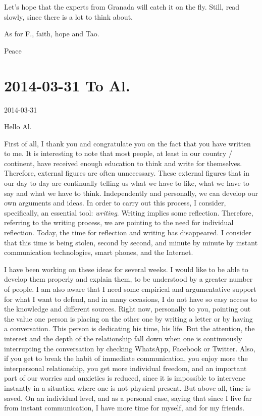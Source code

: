 \documentclass[]{book}
\begin{document}
Let's hope that the experts from Granada will catch it on the fly. Still, read slowly, since there is a lot to think about.

As for F., faith, hope and Tao.

Peace

\hypertarget{ToAl20140331}{%
\section*{2014-03-31 To Al.}\label{ToAl20140331}}

2014-03-31

Hello Al.

First of all, I thank you and congratulate you on the fact that you have written to me. It is interesting to note that most people, at least in our country / continent, have received enough education to think and write for themselves. Therefore, external figures are often unnecessary. These external figures that in our day to day are continually telling us what we have to like, what we have to say and what we have to think. Independently and personally, we can develop our own arguments and ideas. In order to carry out this process, I consider, specifically, an essential tool: \emph{writing}. Writing implies some reflection. Therefore, referring to the writing process, we are pointing to the need for individual reflection. Today, the time for reflection and writing has disappeared. I consider that this time is being stolen, second by second, and minute by minute by instant communication technologies, smart phones, and the Internet.

I have been working on these ideas for several weeks. I would like to be able to develop them properly and explain them, to be understood by a greater number of people. I am also aware that I need some empirical and argumentative support for what I want to defend, and in many occasions, I do not have so easy access to the knowledge and different sources. Right now, personally to you, pointing out the value one person is placing on the other one by writing a letter or by having a conversation. This person is dedicating his time, his life. But the attention, the interest and the depth of the relationship fall down when one is continuously interrupting the conversation by checking WhatsApp, Facebook or Twitter. Also, if you get to break the habit of immediate communication, you enjoy more the interpersonal relationship, you get more individual freedom, and an important part of our worries and anxieties is reduced, since it is impossible to intervene instantly in a situation where one is not physical present. But above all, time is saved. On an individual level, and as a personal case, saying that since I live far from instant communication, I have more time for myself, and for my friends.
\end{document}
